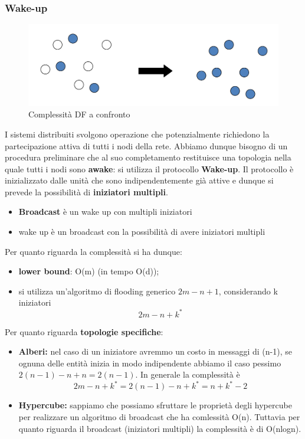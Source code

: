 \documentclass[12pt]{article}
\begin{document}
		\subsubsection{Wake-up}
			\begin{figure}[h!]
				\centering
				\includegraphics[scale=0.3]{img/wake.png}
				\caption{Complessità DF a confronto}
			\end{figure}
			I sistemi distribuiti svolgono operazione che potenzialmente richiedono la partecipazione attiva di tutti i nodi della rete. Abbiamo dunque bisogno di un procedura preliminare che al suo completamento restituisce una topologia nella quale tutti i nodi sono \textbf{awake}: si utilizza il protocollo \textbf{Wake-up}. Il protocollo è inizializzato dalle unità che sono indipendentemente già attive e dunque si prevede la possibilità di \textbf{iniziatori multipli}.
			\begin{itemize}
				\item \textbf{Broadcast} è un wake up con multipli iniziatori
				\item wake up è un broadcast con la possibilità di avere iniziatori multipli
			\end{itemize}
			Per quanto riguarda la complessità si ha dunque:
			\begin{itemize}
				\item \textbf{lower bound}: O(m) (in  tempo O(d));
				\item si utilizza un'algoritmo di flooding generico $2m-n+1$, considerando k iniziatori 	$$2m-n+k^*$$
			\end{itemize}
		  	Per quanto riguarda \textbf{topologie specifiche}:
		  	\begin{itemize}
		  		\item \textbf{Alberi:} nel caso di un iniziatore avremmo un costo in messaggi di (n-1), se ognuna delle entità inizia in modo indipendente abbiamo il caso pessimo $2(n-1)-n+n =  2(n-1)$.  In generale la complessità è $$2m-n+k^*=2(n-1)-n+k^*=n+k^*-2$$
		  		\item \textbf{Hypercube:} sappiamo che possiamo sfruttare le proprietà degli hypercube per realizzare un algoritmo di broadcast che ha comlessità O(n). Tuttavia per quanto riguarda il broadcast (iniziatori multipli) la complessità è di O(nlogn). 
		  	\end{itemize}
\end{document}

